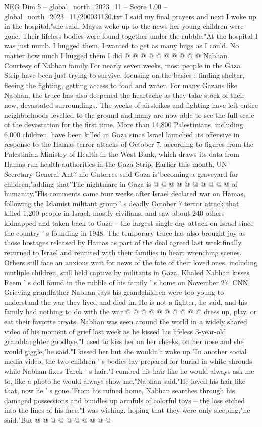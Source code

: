 \begin{textsample}{NEG Dim 5 – global\_north\_2023\_11 – Score 1.00 – global\_north\_2023\_11/200031130.txt}
I said my final prayers and next I woke up in the hospital,"she said.
Maysa woke up to the news her young children were gone.
Their lifeless bodies were found together under the rubble."At the hospital I was just numb.
I hugged them, I wanted to get as many hugs as I could.
No matter how much I hugged them I did @ @ @ @ @ @ @ @ @ @ Nabhan.
Courtesy of Nabhan family For nearly seven weeks, most people in the Gaza Strip have been just trying to survive, focusing on the basics : finding shelter, fleeing the fighting, getting access to food and water.
For many Gazans like Nabhan, the truce has also deepened the heartache as they take stock of their new, devastated surroundings.
The weeks of airstrikes and fighting have left entire neighborhoods levelled to the ground and many are now able to see the full scale of the devastation for the first time.
More than 14,800 Palestinians, including 6,000 children, have been killed in Gaza since Israel launched its offensive in response to the Hamas terror attacks of October 7, according to figures from the Palestinian Ministry of Health in the West Bank, which draws its data from Hamas-run health authorities in the Gaza Strip.
Earlier this month, UN Secretary-General Ant? nio Guterres said Gaza is"becoming a graveyard for children,"adding that"The nightmare in Gaza is @ @ @ @ @ @ @ @ @ @ of humanity."His comments came four weeks after Israel declared war on Hamas, following the Islamist militant group ' s deadly October 7 terror attack that killed 1,200 people in Israel, mostly civilians, and saw about 240 others kidnapped and taken back to Gaza -- the largest single day attack on Israel since the country ' s founding in 1948.
The temporary truce has also brought joy as those hostages released by Hamas as part of the deal agreed last week finally returned to Israel and reunited with their families in heart wrenching scenes.
Others still face an anxious wait for news of the fate of their loved ones, including mutliple children, still held captive by militants in Gaza.
Khaled Nabhan kisses Reem ' s doll found in the rubble of his family ' s home on November 27.
CNN Grieving grandfather Nabhan says his grandchildren were too young to understand the war they lived and died in.
He is not a fighter, he said, and his family had nothing to do with the war @ @ @ @ @ @ @ @ @ @ dress up, play, or eat their favorite treats.
Nabhan was seen around the world in a widely shared video of his moment of grief last week as he kissed his lifeless 3-year-old granddaughter goodbye."I used to kiss her on her cheeks, on her nose and she would giggle,"he said."I kissed her but she wouldn't wake up."In another social media video, the two children ' s bodies lay prepared for burial in white shrouds while Nabhan fixes Tarek ' s hair."I combed his hair like he would always ask me to, like a photo he would always show me,"Nabhan said."He loved his hair like that, now he ' s gone."From his ruined home, Nabhan searches through his damaged possessions and bundles up armfuls of colorful toys -- the loss etched into the lines of his face."I was wishing, hoping that they were only sleeping,"he said."But @ @ @ @ @ @ @ @ @ @

\end{textsample}
